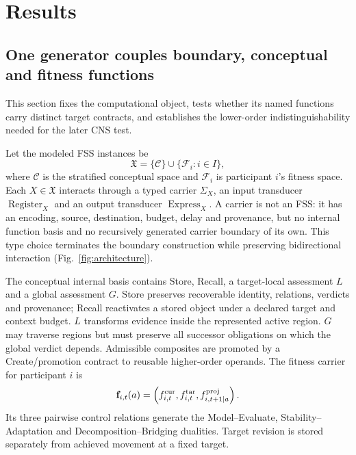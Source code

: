 \documentclass[10pt]{article}
\newcommand{\Reg}{\operatorname{Register}}
\newcommand{\Exp}{\operatorname{Express}}
\begin{document}
\section*{Results}

\subsection*{One generator couples boundary, conceptual and fitness functions}
This section fixes the computational object, tests whether its named functions carry distinct target contracts, and establishes the lower-order indistinguishability needed for the later CNS test.

Let the modeled FSS instances be
\begin{equation}
\mathfrak X=\{\mathcal C\}\cup\{\mathcal F_i:i\in I\},
\end{equation}
where $\mathcal C$ is the stratified conceptual space and $\mathcal F_i$ is participant $i$'s fitness space. Each $X\in\mathfrak X$ interacts through a typed carrier $\Sigma_X$, an input transducer $\Reg_X$ and an output transducer $\Exp_X$. A carrier is not an FSS: it has an encoding, source, destination, budget, delay and provenance, but no internal function basis and no recursively generated carrier boundary of its own. This type choice terminates the boundary construction while preserving bidirectional interaction (Fig.~\ref{fig:architecture}).

The conceptual internal basis contains Store, Recall, a target-local assessment $L$ and a global assessment $G$. Store preserves recoverable identity, relations, verdicts and provenance; Recall reactivates a stored object under a declared target and context budget. $L$ transforms evidence inside the represented active region. $G$ may traverse regions but must preserve all successor obligations on which the global verdict depends. Admissible composites are promoted by a Create/promotion contract to reusable higher-order operands. The fitness carrier for participant $i$ is
\begin{equation}
\mathbf f_{i,t}(a)=\left(f^{\rm cur}_{i,t},f^{\rm tar}_{i,t},f^{\rm proj}_{i,t+1\mid a}\right).
\label{eq:triad}
\end{equation}
Its three pairwise control relations generate the Model--Evaluate, Stability--Adaptation and Decomposition--Bridging dualities. Target revision is stored separately from achieved movement at a fixed target.
\end{document}
